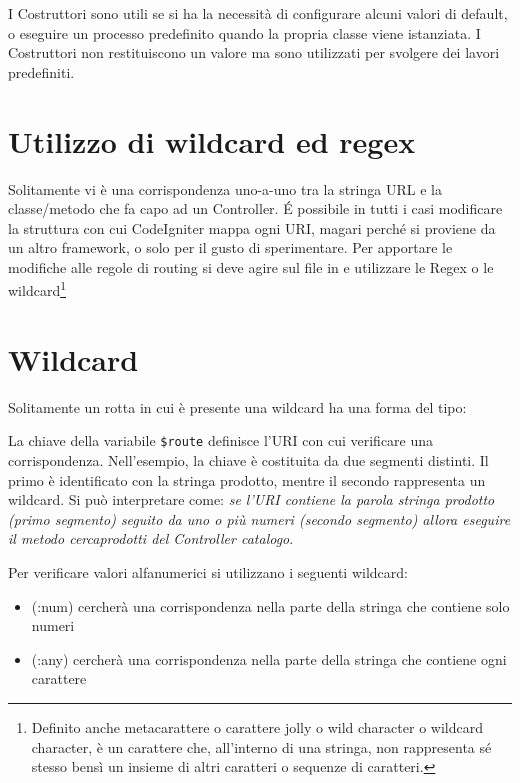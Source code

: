 I Costruttori sono utili se si ha la necessità di configurare alcuni valori di default, o eseguire un processo predefinito quando la propria classe viene istanziata. I Costruttori non restituiscono un valore ma sono utilizzati per svolgere dei lavori predefiniti.

\section{Utilizzo di wildcard ed regex}
Solitamente vi è una corrispondenza uno-a-uno tra la stringa \ac{URL} e la classe/metodo che fa capo ad un Controller. \'E possibile in tutti i casi modificare la struttura con cui CodeIgniter mappa ogni \ac{URI}, magari perché si proviene da un altro framework, o solo per il gusto di sperimentare. Per apportare le modifiche alle regole di routing si deve agire sul file  in  e utilizzare le Regex o le wildcard\footnote{Definito anche metacarattere o carattere jolly o wild character o wildcard character, è un carattere che, all'interno di una stringa, non rappresenta sé stesso bensì un insieme di altri caratteri o sequenze di caratteri.}

\section{Wildcard}
Solitamente un rotta in cui è presente una wildcard ha una forma del tipo:


La chiave della variabile \verb|$route| definisce l'\ac{URI} con cui verificare una corrispondenza. Nell'esempio, la chiave è costituita da due segmenti distinti. Il primo è identificato con la stringa prodotto, mentre il secondo rappresenta un wildcard. Si può interpretare come: \emph{se l'URI contiene la parola stringa prodotto (primo segmento) seguito da uno o più numeri (secondo segmento) allora eseguire il metodo cercaprodotti del Controller catalogo}.

Per verificare valori alfanumerici si utilizzano i seguenti wildcard:

\begin{itemize}
\item (:num) cercherà una corrispondenza nella parte della stringa che contiene solo numeri

\item (:any) cercherà una corrispondenza nella parte della stringa che contiene ogni carattere
\end{itemize}

